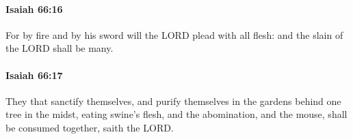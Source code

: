 		\paragraph{Isaiah 66:16} %
			\label{ISAIAH-66-16}

			For by fire and by his sword will the LORD plead with all flesh: and the slain of the LORD shall be many.


		\paragraph{Isaiah 66:17} %
			\label{ISAIAH-66-17}

			They that sanctify themselves, and purify themselves in the gardens behind one tree in the midst, eating swine's flesh, and the abomination, and the mouse, shall be consumed together, saith the LORD.



